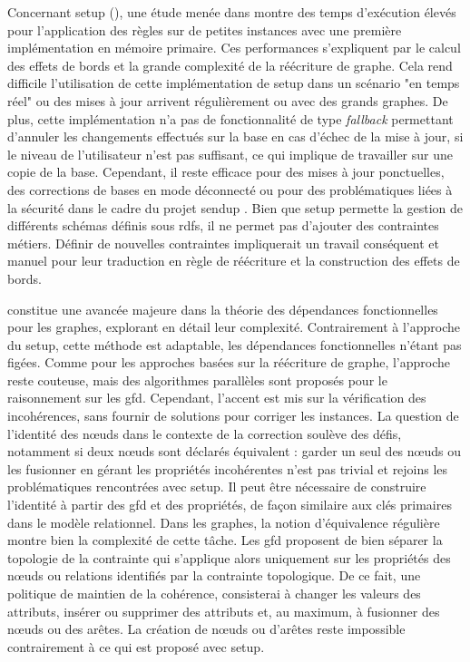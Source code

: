 Concernant \gls{setup} (\cite{chabinUsingGraphGrammar2019}), une étude menée dans \cite{chabinGraphRewritingSystem2020,chabinGraphRewritingRules2021} montre des temps d'exécution élevés pour l'application des règles sur de petites instances avec une première implémentation en mémoire primaire.
Ces performances s'expliquent par le calcul des effets de bords et la grande complexité de la réécriture de graphe.
Cela rend difficile l'utilisation de cette implémentation de \gls{setup} dans un scénario "en temps réel" ou des mises à jour arrivent régulièrement ou avec des grands graphes.
De plus, cette implémentation n'a pas de fonctionnalité de type \emph{fallback} permettant d'annuler les changements effectués sur la base en cas d'échec de la mise à jour, si le niveau de l'utilisateur n'est pas suffisant, ce qui implique de travailler sur une copie de la base.
Cependant, il reste efficace pour des mises à jour ponctuelles, des corrections de bases en mode déconnecté ou pour des problématiques liées à la sécurité dans le cadre du projet \gls{sendup} \cite{boiretPrivacyOperatorsSemantic2022}.
Bien que \gls{setup} permette la gestion de différents schémas définis sous \gls{rdfs}, il ne permet pas d'ajouter des contraintes métiers.
Définir de nouvelles contraintes impliquerait un travail conséquent et manuel pour leur traduction en règle de réécriture et la construction des effets de bords.

\cite{fanDependenciesGraphs2019} constitue une avancée majeure dans la théorie des dépendances fonctionnelles pour les graphes, explorant en détail leur complexité.
Contrairement à l'approche du \gls{setup}, cette méthode est adaptable, les dépendances fonctionnelles n'étant pas figées.
Comme pour les approches basées sur la réécriture de graphe, l'approche reste couteuse, mais des algorithmes parallèles sont proposés pour le raisonnement sur les \gls{gfd}.
Cependant, l'accent est mis sur la vérification des incohérences, sans fournir de solutions pour corriger les instances.
La question de l'identité des nœuds dans le contexte de la correction soulève des défis, notamment si deux nœuds sont déclarés équivalent : garder un seul des nœuds ou les fusionner en gérant les propriétés incohérentes n'est pas trivial et rejoins les problématiques rencontrées avec \gls{setup}.
Il peut être nécessaire de construire l'identité à partir des \gls{gfd} et des propriétés, de façon similaire aux clés primaires dans le modèle relationnel.
Dans les graphes, la notion d'équivalence régulière \cite{everettRegularEquivalenceGeneral1994} montre bien la complexité de cette tâche.
Les \gls{gfd} proposent de bien séparer la topologie de la contrainte qui s'applique alors uniquement sur les propriétés des nœuds ou relations identifiés par la contrainte topologique.
De ce fait, une politique de maintien de la cohérence, consisterai à changer les valeurs des attributs, insérer ou supprimer des attributs et, au maximum, à fusionner des nœuds ou des arêtes.
La création de nœuds ou d'arêtes reste impossible contrairement à ce qui est proposé avec \gls{setup}.

